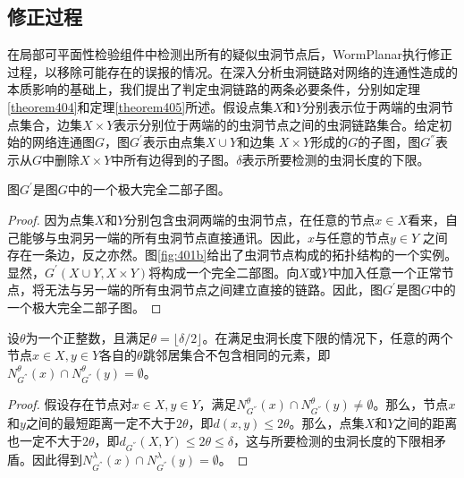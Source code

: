 \subsection{修正过程}
在局部可平面性检验组件中检测出所有的疑似虫洞节点后，WormPlanar执行修正过程，以移除可能存在的误报的情况。在深入分析虫洞链路对网络的连通性造成的本质影响的基础上，我们提出了判定虫洞链路的两条必要条件，分别如定理\ref{theorem404}和定理\ref{theorem405}所述。假设点集$X$和$Y$分别表示位于两端的虫洞节点集合，边集$X\times{Y}$表示分别位于两端的的虫洞节点之间的虫洞链路集合。给定初始的网络连通图$G$，图$G^{'}$表示由点集$X\cup{Y}$和边集
$X\times{Y}$形成的$G$的子图，图$G^{''}$表示从$G$中删除$X\times{Y}$中所有边得到的子图。$\delta$表示所要检测的虫洞长度的下限。

\begin{theorem}
  \label{theorem404}
图$G^{'}$是图$G$中的一个极大完全二部子图。
\end{theorem}
\begin{proof}
因为点集$X$和$Y$分别包含虫洞两端的虫洞节点，在任意的节点$x\in{X}$看来，自己能够与虫洞另一端的所有虫洞节点直接通讯。因此，$x$与任意的节点$y\in{Y}$ 之间存在一条边，反之亦然。图\ref{fig:401b}给出了虫洞节点构成的拓扑结构的一个实例。显然，$G^{'}(X\cup{Y},X\times{Y})$将构成一个完全二部图。向$X$或$Y$中加入任意一个正常节点，将无法与另一端的所有虫洞节点之间建立直接的链路。因此，图$G^{'}$是图$G$中的一个极大完全二部子图。
\end{proof}

\begin{theorem}
  \label{theorem405}
设$\theta$为一个正整数，且满足$\theta=\lfloor\delta/2\rfloor$。在满足虫洞长度下限的情况下，任意的两个节点$x\in{X},y\in{Y}$各自的$\theta$跳邻居集合不包含相同的元素，即$N_{G^{''}}^{\theta}(x)\cap{N_{G^{''}}^{\theta}(y)}=\emptyset$。
\end{theorem}
\begin{proof}
假设存在节点对$x\in{X},y\in{Y}$，满足$N_{G^{''}}^{\theta}(x)\cap{N_{G^{''}}^{\theta}(y)}\not=\emptyset$。那么，节点$x$和$y$之间的最短距离一定不大于$2\theta$，即$d(x,y)\le{2\theta}$。那么，点集$X$和$Y$之间的距离也一定不大于$2\theta$，即$d_{G^{''}}(X,Y)\le2\theta\le\delta$，这与所要检测的虫洞长度的下限相矛盾。因此得到$N_{G^{''}}^{\lambda}(x)\cap{N_{G^{''}}^{\lambda}(y)}=\emptyset$。
\end{proof}

